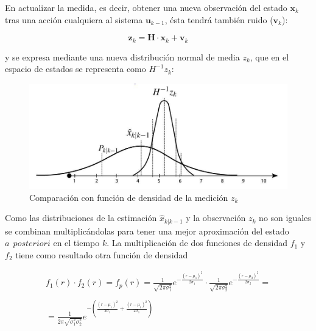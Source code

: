 \documentclass[twoside,11pt]{book}
\begin{document}
En actualizar la medida, es decir, obtener una nueva observación del estado $\mathbf{x}_{k}$ tras una acción cualquiera al sistema  $\mathbf{u}_{k-1}$, ésta tendrá también ruido ($\mathbf{v}_{k}$):

\begin{equation}
\mathbf{z}_{k}=\mathbf{H} \cdot \mathbf{x}_{k} + \mathbf{v}_{k}
\end{equation}

y se expresa mediante una nueva distribución normal de media $z_{k}$, que en el espacio de estados se representa como $H^{-1}z_{k}$:

\begin{figure}[h!]
\begin{center}
\includegraphics[scale=0.35,bb=0 0 800 350]{images/comp_fun_dens_x.png}
\caption{Comparación con función de densidad de la medición $z_{k}$}
\end{center}
\end{figure}

Como las distribuciones de la estimación $\hat{x}_{k|k-1}$ y la observación $z_{k}$ no son iguales se combinan multiplicándolas para tener una mejor aproximación del estado $a \>\> posteriori$ en el tiempo $k$. La multiplicación de dos funciones de densidad $f_{1}$ y $f_{2}$ tiene como resultado otra función de densidad 

\begin{equation}
\begin{array}{c}
f_{1}(r) \cdot f_{2}(r) = f_{p}(r)= \frac{1}{\sqrt{2\pi \sigma^{2}_{1}}}e^{-\frac{(r-\mu_{1})^{2}}{2\sigma_{1}}} \cdot \frac{1}{\sqrt{2\pi \sigma^{2}_{2}}}e^{-\frac{(r-\mu_{2})^{2}}{2\sigma_{2}}} = \\   \\
=\frac{1}{2\pi \sqrt{\sigma^{2}_{1}\sigma^{2}_{2}}}e^{-\left(\frac{(r-\mu_{1})^{2}}{2\sigma_{1}}+\frac{(r-\mu_{1})^{2}}{2\sigma_{1}}\right)} \end{array}
\end{equation}
\end{document}
